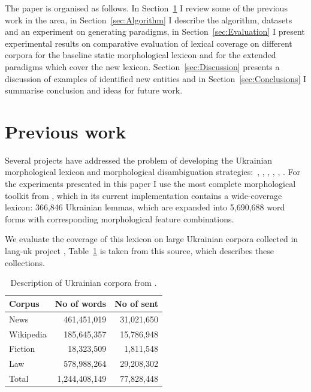 \documentclass[11pt,a4paper]{article}
\begin{document}
The paper is organised as follows. In Section~\ref{sec:PrevWork} I review some of the previous work in the area, in Section~\ref{sec:Algorithm} I describe the algorithm, datasets and an experiment on generating paradigms, in Section~\ref{sec:Evaluation} I present experimental results on comparative evaluation of lexical coverage on different corpora for the baseline static morphological lexicon and for the extended paradigms which cover the new lexicon. Section~\ref{sec:Discussion} presents a discussion of examples of identified new entities and in Section~\ref{sec:Conclusions} I summarise conclusion and ideas for future work.

\section{Previous work}
\label{sec:PrevWork}

Several projects have addressed the problem of developing the Ukrainian morphological lexicon and morphological disambiguation strategies:~\cite{gryaznukhina-ed-1989}, \cite{gryaznukhina-ed-1999}, \cite{Rysin-Starko-2019}, \cite{kotsyba2009ugtag}, \cite{kotsyba2010multext}, \cite{babych2016ukrainian}. For the experiments presented in this paper I use the most complete morphological toolkit from \cite{Rysin-Starko-2019}, which in its current implementation contains a wide-coverage lexicon: 366,846 Ukrainian lemmas, which are expanded into 5,690,688 word forms with corresponding morphological feature combinations.

We evaluate the coverage of this lexicon on large Ukrainian corpora collected in lang-uk project \cite{Dyomkin-2019}, Table~\ref{lang-uk-corpus-description} is taken from this source, which describes these collections.


\begin{table}[]
	\begin{center}
		\begin{tabular}{|l|rr|}
			\hline \textbf{Corpus} & \textbf{No of words} & \textbf{No of sent} \\ \hline
			News & 461,451,019 & 31,021,650 \\
			Wikipedia & 185,645,357 & 15,786,948 \\
			Fiction & 18,323,509 & 1,811,548 \\
			Law  & 578,988,264 & 29,208,302 \\
			\hline
			Total & 1,244,408,149 &  77,828,448\\
			\hline
		\end{tabular}
	\end{center}
	\caption{\label{lang-uk-corpus-description} Description of Ukrainian corpora from \cite{Dyomkin-2019}. }
\end{table}
\end{document}
